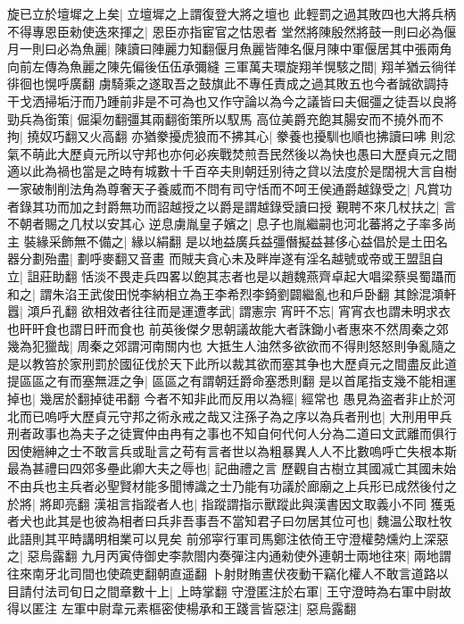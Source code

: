 旋已立於壇墀之上矣|{
	立壇墀之上謂復登大將之壇也}
此輕罰之過其敗四也大將兵柄不得專恩臣勑使迭來揮之|{
	恩臣亦指宦官之怙恩者}
堂然將陳殷然將鼓一則曰必為偃月一則曰必為魚麗|{
	陳讀曰陣麗力知翻偃月魚麗皆陣名偃月陳中軍偃居其中張兩角向前左傳為魚麗之陳先偏後伍伍承彌縫}
三軍萬夫環旋翔羊愰駭之間|{
	翔羊猶云徜徉徘徊也愰呼廣翻}
虜騎乘之遂取吾之鼓旗此不專任責成之過其敗五也今者誠欲調持干戈洒掃垢汙而乃踵前非是不可為也又作守論以為今之議皆曰夫倔彊之徒吾以良將勁兵為銜策|{
	倔渠勿翻彊其兩翻銜策所以馭馬}
高位美爵充飽其腸安而不撓外而不拘|{
	撓奴巧翻又火高翻}
亦猶豢擾虎狼而不拂其心|{
	豢養也擾馴也順也拂讀曰咈}
則忿氣不萌此大歷貞元所以守邦也亦何必疾戰焚煎吾民然後以為快也愚曰大歷貞元之間適以此為禍也當是之時有城數十千百卒夫則朝廷别待之貸以法度於是闊視大言自樹一家破制削法角為尊奢天子養威而不問有司守恬而不呵王侯通爵越錄受之|{
	凡賞功者錄其功而加之封爵無功而詔越授之以爵是謂越錄受讀曰授}
覲聘不來几杖扶之|{
	言不朝者賜之几杖以安其心}
逆息虜胤皇子嬪之|{
	息子也胤繼嗣也河北蕃將之子率多尚主}
裝緣采飾無不備之|{
	緣以絹翻}
是以地益廣兵益彊僭擬益甚侈心益倡於是土田名器分劃殆盡|{
	劃呼麥翻又音畫}
而賊夫貪心未及畔岸遂有淫名越號或帝或王盟詛自立|{
	詛莊助翻}
恬淡不畏走兵四畧以飽其志者也是以趙魏燕齊卓起大唱梁蔡吳蜀躡而和之|{
	謂朱淊王武俊田悦李納相立為王李希烈李錡劉闢繼亂也和戶卧翻}
其餘混澒軒囂|{
	澒戶孔翻}
欲相效者往往而是運遭孝武|{
	謂憲宗}
宵旰不忘|{
	宵宵衣也謂未明求衣也旰旰食也謂日旰而食也}
前英後傑夕思朝議故能大者誅鋤小者惠來不然周秦之郊幾為犯獵哉|{
	周秦之郊謂河南關内也}
大抵生人油然多欲欲而不得則怒怒則争亂隨之是以教笞於家刑罰於國征伐於天下此所以裁其欲而塞其争也大歷貞元之間盡反此道提區區之有而塞無涯之争|{
	區區之有謂朝廷爵命塞悉則翻}
是以首尾指支幾不能相運掉也|{
	幾居於翻掉徒弔翻}
今者不知非此而反用以為經|{
	經常也}
愚見為盗者非止於河北而已嗚呼大歷貞元守邦之術永戒之哉又注孫子為之序以為兵者刑也|{
	大刑用甲兵}
刑者政事也為夫子之徒實仲由冉有之事也不知自何代何人分為二道曰文武離而俱行因使縉紳之士不敢言兵或耻言之苟有言者世以為粗暴異人人不比數嗚呼亡失根本斯最為甚禮曰四郊多壘此卿大夫之辱也|{
	記曲禮之言}
歷觀自古樹立其國㓕亡其國未始不由兵也主兵者必聖賢材能多聞博識之士乃能有功議於廊廟之上兵形已成然後付之於將|{
	將即亮翻}
漢祖言指蹤者人也|{
	指蹤謂指示獸蹤此與漢書因文取義小不同}
獲兎者犬也此其是也彼為相者曰兵非吾事吾不當知君子曰勿居其位可也|{
	魏温公取杜牧此語則其平時講明相業可以見矣}
前邠寜行軍司馬鄭注依倚王守澄權勢燻灼上深惡之|{
	惡烏露翻}
九月丙寅侍御史李款閤内奏彈注内通勑使外連朝士兩地往來|{
	兩地謂往來南牙北司間也使疏吏翻朝直遥翻}
卜射財賄晝伏夜動干竊化權人不敢言道路以目請付法司旬日之間章數十上|{
	上時掌翻}
守澄匿注於右軍|{
	王守澄時為右軍中尉故得以匿注}
左軍中尉韋元素樞密使楊承和王踐言皆惡注|{
	惡烏露翻}
